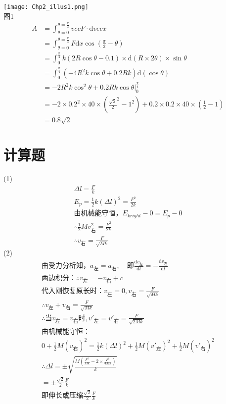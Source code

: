 \documentclass[b5paper,opensource]{./template/qyxf-book}
\newcommand{\di}[1]{\mathrm{d}#1}
\newcommand{\dy}[2]{\frac{\di{#1}}{\di{#2}}}
\begin{document}
\solve
\centering\texttt{[image: Chp2\_illus1.png]}\\
图1
\begin{align*}
A	&=\int_{\theta=0}^{\theta=\frac{\pi}{4}}{vec{F}}\cdot\di{vec{x}}\\
&=\int_{\theta=0}^{\theta=\frac{\pi}{4}}F\di{x}\cos\left(\frac{\pi}{2}-\theta\right)\\
&=\int_{0}^{\frac{\pi}{4}}k(2R\cos\theta-0.1)\times\di{(R\times 2\theta)}\times\sin\theta\\
&=\int_{0}^{\frac{\pi}{4}}(-4R^2k\cos\theta+0.2Rk)\di{(\cos\theta)}\\
&=-2R^2k\cos^2\theta+0.2Rk\cos\theta\left.\right|_0^{\frac{\pi}{4}}\\
&=-2\times 0.2^2\times 40\times({\frac{\sqrt{2}}{2}}^2-1^2)+0.2\times 0.2\times 40\times(\frac{1}{2}-1)\\
&=0.8\sqrt{2}
\end{align*}
\raggedright
\section{计算题}

\solve (1)
\begin{gather*}
\Delta l=\frac{F}{k}\\
E_p=\frac{1}{2}k(\Delta l)^2=\frac{F^2}{2k}\\
\text{由机械能守恒，}E_{kright}-0=E_p-0\\
\therefore\frac{1}{2}Mv_{\text{右}}^2=\frac{F^2}{2k}\\
\therefore v_{\text{右}}=\frac{F}{\sqrt{Mk}}
\end{gather*}
(2)
\begin{gather*}
\text{由受力分析知，}a_{\text{左}}=a_{\text{右}},\quad\text{即}\dy{v_{\text{左}}}{t}=-\dy{v_{\text{右}}}{t}\\
\text{两边积分：}\therefore v_{\text{左}}=-v_{\text{右}}+c\\
\text{代入刚恢复原长时：}v_{\text{左}}=0,v_{\text{右}}=\frac{F}{\sqrt{Mk}}\\
\therefore v_{\text{左}}+v_{\text{右}}=\frac{F}{\sqrt{Mk}}\\
\therefore\text{当}v_{\text{左}}=v_{\text{右}}\text{时},v'_{\text{左}}=v'_{\text{右}}=\frac{F}{\sqrt{2Mk}}\\
\text{由机械能守恒：}\\
0+\frac{1}{2}M(v_{\text{右}})^2=\frac{1}{2}k(\Delta l)^2+\frac{1}{2}M(v'_{\text{左}})^2+\frac{1}{2}M(v'_{\text{右}})^2\\
\therefore\Delta l=\pm\sqrt{\frac{M\left(\frac{F^2}{Mk}-2\times\frac{F^2}{4Mk}\right)}{k}}\\
=\pm\frac{\sqrt{2}}{2}\frac{F}{k}\\
\text{即伸长或压缩}\frac{\sqrt{2}}{2}\frac{F}{k}
\end{gather*}
\end{document}
